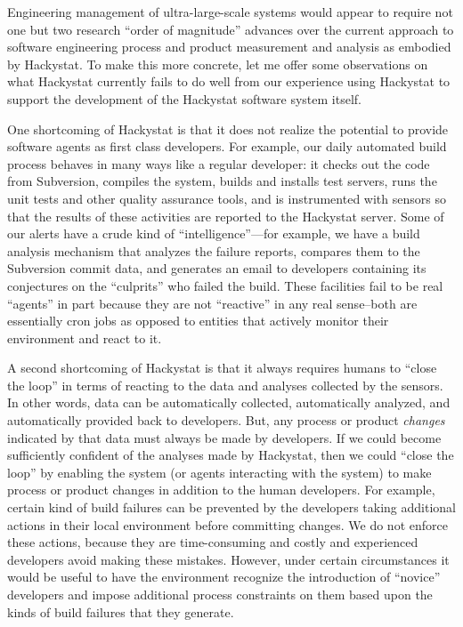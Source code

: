 \documentclass[10pt,twocolumn]{article}
\begin{document}

Engineering management of ultra-large-scale systems would appear to require not one
but two research ``order of magnitude'' advances over the current approach
to software engineering process and product measurement and analysis as
embodied by Hackystat. To make this more concrete, let me offer some
observations on what Hackystat currently fails to do well from our
experience using Hackystat to support the development of the Hackystat
software system itself.

One shortcoming of Hackystat is that it does not realize the potential to
provide software agents as first class developers.  For example, our daily
automated build process behaves in many ways like a regular developer: it
checks out the code from Subversion, compiles the system, builds and
installs test servers, runs the unit tests and other quality assurance
tools, and is instrumented with sensors so that the results of these
activities are reported to the Hackystat server.  Some of our alerts have a
crude kind of ``intelligence''---for example, we have a build analysis
mechanism that analyzes the failure reports, compares them to the
Subversion commit data, and generates an email to developers containing its
conjectures on the ``culprits'' who failed the build.  These facilities
fail to be real ``agents'' in part because they are not ``reactive'' in any
real sense--both are essentially cron jobs as opposed to entities that
actively monitor their environment and react to it.

A second shortcoming of Hackystat is that it always requires humans to
``close the loop'' in terms of reacting to the data and analyses collected
by the sensors.  In other words, data can be automatically collected,
automatically analyzed, and automatically provided back to developers.
But, any process or product {\em changes} indicated by that data must
always be made by developers.  If we could become sufficiently confident of
the analyses made by Hackystat, then we could ``close the loop'' by
enabling the system (or agents interacting with the system) to make process
or product changes in addition to the human developers.  For example,
certain kind of build failures can be prevented by the developers taking
additional actions in their local environment before committing changes.
We do not enforce these actions, because they are time-consuming and costly
and experienced developers avoid making these mistakes.  However, under
certain circumstances it would be useful to have the environment recognize
the introduction of ``novice'' developers and impose additional process
constraints on them based upon the kinds of build failures that they
generate.
\end{document}
